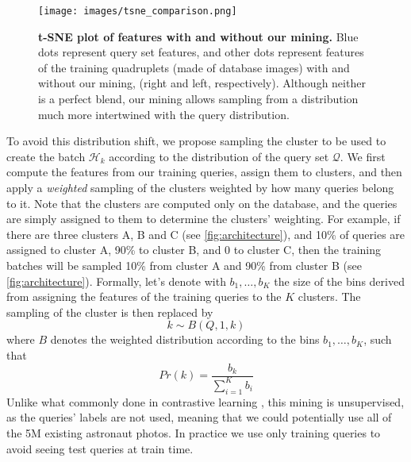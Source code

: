 \begin{figure}
    \begin{center}
    \texttt{[image: images/tsne\_comparison.png]}
    \end{center}
    \vspace{-5mm}
    \caption{\textbf{t-SNE plot of features with and without our mining.} Blue dots represent query set features, and other dots represent features of the training quadruplets (made of database images) with and without our mining, (right and left, respectively). Although neither is a perfect blend,  our mining allows sampling from a distribution much more intertwined with the query distribution.}
    \vspace{-5mm}
    \label{fig:tsne}
\end{figure}
To avoid this distribution shift, we propose sampling the cluster to be used to create the batch $\mathcal{H}_k$ according to the distribution of the query set $\mathcal{Q}$. We first compute the features from our training queries, assign them to clusters, and then apply a \textit{weighted} sampling of the clusters weighted by how many queries belong to it.
Note that the clusters are computed only on the database, and the queries are simply assigned to them to determine the clusters' weighting.
For example, if there are three clusters A, B and C (see \cref{fig:architecture}), and 10\% of queries are assigned to cluster A, 90\% to cluster B, and 0 to cluster C, then the training batches will be sampled 10\% from cluster A and 90\% from cluster B (see \cref{fig:architecture}).
Formally, let's denote with $b_1, \ldots, b_K$ the size of the bins derived from assigning the features of the training queries to the $K$ clusters.
The sampling of the cluster is then replaced by
{\small
\begin{equation}
    k\sim B(Q, 1, k)
    \label{eq:weighted_sampling}
\end{equation}
}
where $B$ denotes the weighted distribution according to the bins $b_1, \ldots, b_K$, \ie such that 
{\small
\begin{equation}
  Pr(k) = \frac{b_k}{\sum_{i=1}^{K}{b_i}}
\end{equation}
}
Unlike what commonly done in contrastive learning \cite{Musgrave_2020_PyTorchML, Arandjelovic_2018_netvlad, AliBey_2022_BMVC, Musgrave_2020_ML_reality}, this mining is unsupervised, as the queries' labels are not used, meaning that we could potentially use all of the 5M existing astronaut photos.
In practice we use only training queries to avoid seeing test queries at train time.
